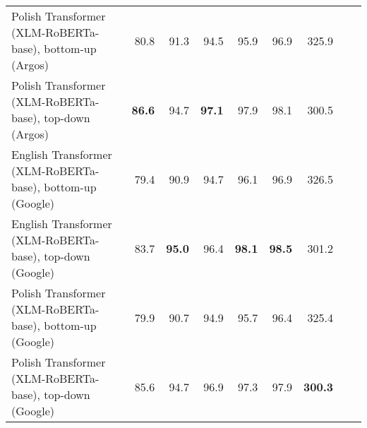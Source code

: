 \begin{table}[ht!]
{\begin{tabular}{lrrrrrrrr}
  Polish Transformer (XLM-RoBERTa-base), bottom-up (Argos) & 80.8 & 91.3 & 94.5 & 95.9 & 96.9 & 325.9 \\ 
  Polish Transformer (XLM-RoBERTa-base), top-down (Argos) & \textbf{86.6} & 94.7 & \textbf{97.1} & 97.9 & 98.1 & 300.5 \\ 
  English Transformer (XLM-RoBERTa-base), bottom-up (Google) & 79.4 & 90.9 & 94.7 & 96.1 & 96.9 & 326.5 \\ 
  English Transformer (XLM-RoBERTa-base), top-down (Google) & 83.7 & \textbf{95.0} & 96.4 & \textbf{98.1} & \textbf{98.5} & 301.2 \\ 
  Polish Transformer (XLM-RoBERTa-base), bottom-up (Google) & 79.9 & 90.7 & 94.9 & 95.7 & 96.4 & 325.4 \\ 
  Polish Transformer (XLM-RoBERTa-base), top-down (Google) & 85.6 & 94.7 & 96.9 & 97.3 & 97.9 & \textbf{300.3} \\ 
   \hline
\end{tabular}
}
\end{table}





